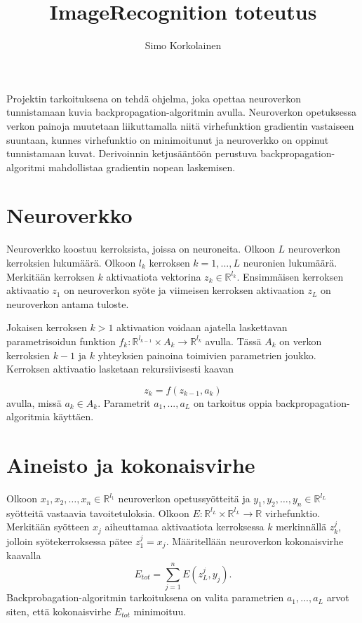 \documentclass[11pt]{article}
\author{Simo Korkolainen}
\title{ImageRecognition toteutus}
\begin{document}
  \maketitle



Projektin tarkoituksena on tehdä ohjelma, joka opettaa neuroverkon tunnistamaan kuvia backpropagation-algoritmin avulla. Neuroverkon opetuksessa verkon painoja muutetaan liikuttamalla niitä virhefunktion gradientin vastaiseen suuntaan, kunnes virhefunktio on minimoitunut ja neuroverkko on oppinut tunnistamaan kuvat. Derivoinnin ketjusääntöön perustuva backpropagation-algoritmi mahdollistaa gradientin nopean laskemisen.



\section{Neuroverkko}


 Neuroverkko koostuu kerroksista, joissa on neuroneita. Olkoon $L$ neuroverkon kerroksien lukumäärä. Olkoon $l_k$ kerroksen $k = 1, ..., L$ neuronien lukumäärä. Merkitään kerroksen $k$ aktivaatiota vektorina $z_k \in \mathbb{R}^{l_k}$. Ensimmäisen kerroksen aktivaatio $z_1$ on neuroverkon syöte ja viimeisen kerroksen aktivaation $z_L$ on neuroverkon antama tuloste.

 Jokaisen kerroksen  $k > 1$ aktivaation voidaan ajatella laskettavan parametrisoidun funktion $f_k : \mathbb{R} ^ {l_{k - 1}} \times A_k \to \mathbb{R} ^ {l_{k}}$ avulla. Tässä $A_k$ on verkon kerroksien $k - 1$ ja $k$ yhteyksien painoina toimivien parametrien joukko. Kerroksen aktivaatio lasketaan rekursiivisesti kaavan 
 
 \begin{equation*}
 z_k = f(z_{k - 1}, a_k) 
 \end{equation*}
 avulla, missä $a_k \in A_k$. Parametrit $a_1, ..., a_L$ on tarkoitus oppia backpropagation-algoritmia käyttäen.
 
 
\section{Aineisto ja kokonaisvirhe}

Olkoon $x_1, x_2, \hdots, x_n \in \mathbb{R}^{l_1}$ neuroverkon opetussyötteitä ja $y_1, y_2, \hdots, y_n \in \mathbb{R}^{l_L}$ syötteitä vastaavia tavoitetuloksia. Olkoon $E:\mathbb{R}^{l_L} \times \mathbb{R}^{l_L} \to \mathbb{R}$ virhefunktio. Merkitään syötteen $x_j$ aiheuttamaa aktivaatiota kerroksessa $k$ merkinnällä $z_k^j$, jolloin syötekerroksessa pätee $z_1^j = x_j$. Määritellään neuroverkon kokonaisvirhe kaavalla
\begin{equation*}
E_{tot} = \sum_{j = 1}^{n} E(z_L^j, y_j).
\end{equation*}
Backprobagation-algoritmin tarkoituksena on valita parametrien $a_1, ..., a_L$ arvot siten, että kokonaisvirhe $E_{tot}$ minimoituu.
\end{document}
